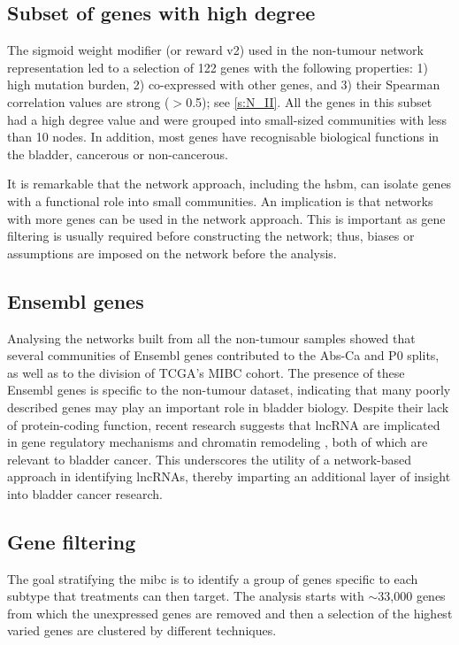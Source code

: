 \subsection*{Subset of genes with high degree}

The sigmoid weight modifier (or reward v2) used in the non-tumour network representation led to a selection of 122 genes with the following properties: 1) high mutation burden, 2) co-expressed with other genes, and 3) their Spearman correlation values are strong (\(>\)0.5); see \cref{s:N_II}. All the genes in this subset had a high degree value and were grouped into small-sized communities with less than 10 nodes. In addition, most genes have recognisable biological functions in the bladder, cancerous or non-cancerous.

It is remarkable that the network approach, including the \acrshort{hsbm}, can isolate genes with a functional role into small communities. An implication is that networks with more genes can be used in the network approach. This is important as gene filtering is usually required before constructing the network; thus, biases or assumptions are imposed on the network before the analysis.

\subsection*{Ensembl genes}

Analysing the networks built from all the non-tumour samples showed that several communities of Ensembl genes contributed to the Abs-Ca and P0 splits, as well as to the division of TCGA's MIBC cohort. The presence of these Ensembl genes is specific to the non-tumour dataset, indicating that many poorly described genes may play an important role in bladder biology. Despite their lack of protein-coding function, recent research suggests that \acrlong{lncRNA} are implicated in gene regulatory mechanisms and chromatin remodeling \citep{Statello2021-md}, both of which are relevant to bladder cancer. This underscores the utility of a network-based approach in identifying lncRNAs, thereby imparting an additional layer of insight into bladder cancer research.

\subsection*{Gene filtering} \label{s:discussion:gene_filt}

The goal stratifying the \acrshort{mibc} is to identify a group of genes specific to each subtype that treatments can then target. The analysis starts with $\sim$33,000 genes from which the unexpressed genes are removed and then a selection of the highest varied genes are clustered by different techniques.


